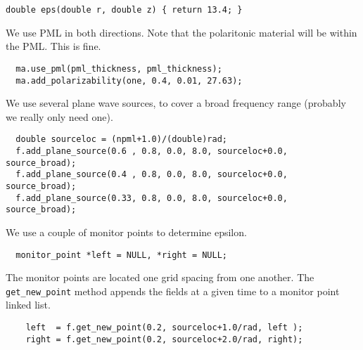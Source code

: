 \begin{verbatim}
double eps(double r, double z) { return 13.4; }
\end{verbatim}
\begin{comment}
double one(double r, double z) { return 1; }

int main(int argc, char **argv) {
  deal_with_ctrl_c();
  const double ttot = 600.0;
  mat ma(eps, rmax + npml/(double)rad, zsize, rad);
  const char *dirname = make_output_directory(argv[0]);
  printf("Storing output in directory %
  ma.set_output_directory(dirname);
\end{comment}
We use PML in both directions.  Note that the polaritonic material will be
within the PML.  This is fine.
\begin{verbatim}
  ma.use_pml(pml_thickness, pml_thickness);
  ma.add_polarizability(one, 0.4, 0.01, 27.63);
\end{verbatim}
\begin{comment}
  fields f(&ma, m);
\end{comment}
We use several plane wave sources, to cover a broad frequency range
(probably we really only need one).
\begin{verbatim}
  double sourceloc = (npml+1.0)/(double)rad;
  f.add_plane_source(0.6 , 0.8, 0.0, 8.0, sourceloc+0.0, source_broad);
  f.add_plane_source(0.4 , 0.8, 0.0, 8.0, sourceloc+0.0, source_broad);
  f.add_plane_source(0.33, 0.8, 0.0, 8.0, sourceloc+0.0, source_broad);
\end{verbatim}
\begin{comment}
  printf("Working on m = %
\end{comment}
We use a couple of monitor points to determine epsilon.
\begin{verbatim}
  monitor_point *left = NULL, *right = NULL;
\end{verbatim}
\begin{comment}
  double next_printtime = 50;
  while (f.time() < ttot && !interrupt) {
    if (f.time() >= next_printtime) {
      next_printtime += 50;
      printf("Working on time %
      printf("energy is %
    }
\end{comment}
The monitor points are located one grid spacing from one another.  The
\verb*|get_new_point| method appends the fields at a given time to a
monitor point linked list.
\begin{verbatim}
    left  = f.get_new_point(0.2, sourceloc+1.0/rad, left );
    right = f.get_new_point(0.2, sourceloc+2.0/rad, right);
\end{verbatim}
